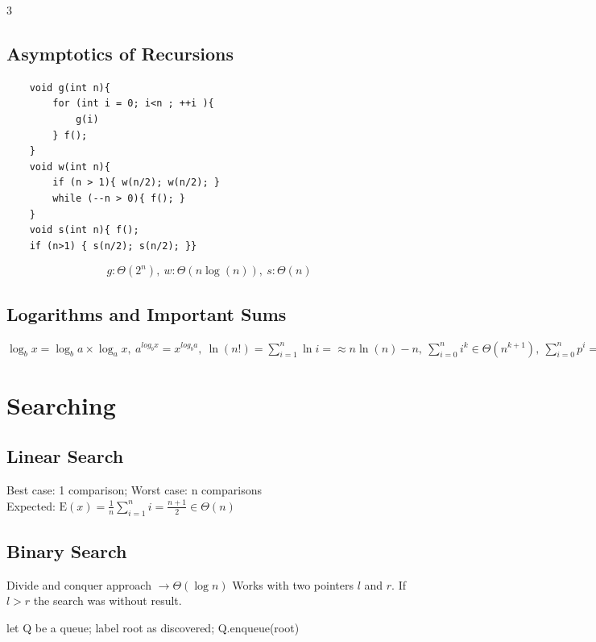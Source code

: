 \documentclass[9pt,landscape,a4paper, table]{extarticle}
\begin{document}
\begin{multicols*}{3}
\subsection{Asymptotics of Recursions}
{\footnotesize
\begin{verbatim}
    void g(int n){
        for (int i = 0; i<n ; ++i ){
            g(i)
        } f();
    }
    void w(int n){
        if (n > 1){ w(n/2); w(n/2); } 
        while (--n > 0){ f(); }
    }
    void s(int n){ f(); 
    if (n>1) { s(n/2); s(n/2); }}
\end{verbatim}
}
$$g: \Theta (2^n),\ w: \Theta(n\log(n)),\ s: \Theta(n)$$

{\footnotesize


\subsection{Logarithms and Important Sums}
$\log_bx=\log_b a \times\log_a x,\ a^{log_b x} = x^{log_b a},\ \ln(n!) = \sum_{i=1}^n \ln i = \approx n\ln(n) - n,\ \sum_{i=0}^n i^k \in \Theta(n^{k+1}),\ \sum_{i=0}^n p^i = \frac{1-p^{n+1}}{1-p},\ \sum_{i=0}^\infty p^i = \frac{1}{1-p} \forall p \in \left[0, 1\right)$
}
\section{Searching}

\subsection{Linear Search}

Best case: 1 comparison; 
Worst case: n comparisons\\
Expected: $\mathrm{E}(x) = \frac{1}{n}\sum_{i=1}^n i = \frac{n+1}{2} \in \Theta(n)$

\subsection{Binary Search}
Divide and conquer approach $\rightarrow \Theta(\log n)$
Works with two pointers $l$ and $r$. If $l > r$ the search was without result.

{\scriptsize
\begin{algorithm}[H]
    \caption{Breadth First Search $\mathcal{O}(|V|+|E|)=\mathcal{O}(b^{d})$}
    
    \SetAlgoLined
    let Q be a queue; label root as discovered; Q.enqueue(root)\\
\end{algorithm}}


\end{multicols*}
\end{document}
